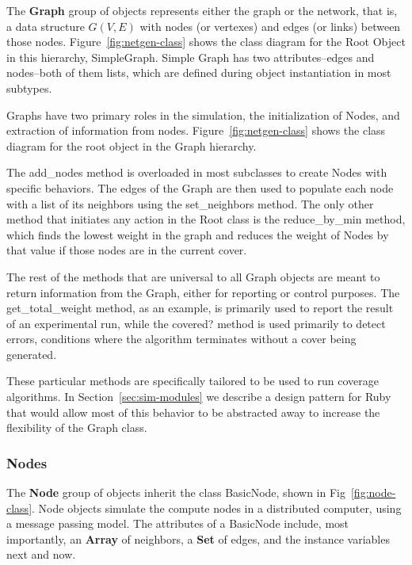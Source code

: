 \documentclass[technote, 10pt, letter]{IEEEtran}
\begin{document}
The {\bfseries Graph} group of objects represents either the graph or the network, that is, a data structure $G(V,E)$ with nodes (or vertexes) and edges (or links) between those nodes. Figure~\ref{fig:netgen-class} shows the class diagram for the Root Object in this hierarchy, {\ttfamily SimpleGraph}. Simple Graph has two attributes--{\ttfamily edges} and {\ttfamily nodes}--both of them lists, which are defined during object instantiation in most subtypes. 



Graphs have two primary roles in the simulation, the initialization of Nodes, and extraction of information from nodes. Figure~\ref{fig:netgen-class} shows the class diagram for the root object in the Graph hierarchy.

The {\ttfamily add\_nodes} method is overloaded in most subclasses to create Nodes with specific behaviors. The edges of the Graph are then used to populate each node with a list of its neighbors using the {\ttfamily set\_neighbors} method. The only other method that initiates any action in the Root class is the {\ttfamily reduce\_by\_min} method, which finds the lowest weight in the graph and reduces the weight of Nodes by that value if those nodes are in the current cover.

The rest of the methods that are universal to all Graph objects are meant to return information from the Graph, either for reporting or control purposes. The {\ttfamily get\_total\_weight} method, as an example, is primarily used to report the result of an experimental run, while the {\ttfamily covered?} method is used primarily to detect errors, conditions where the algorithm terminates without a cover being generated.

These particular methods are specifically tailored to be used to run coverage algorithms. In Section~\ref{sec:sim-modules} we describe a design pattern for Ruby that would allow most of this behavior to be abstracted away to increase the flexibility of the Graph class.

\subsubsection{Nodes}
\label{sec:sim-objects-nodes}
The {\bfseries Node} group of objects inherit the class {\ttfamily BasicNode}, shown in Fig~\ref{fig:node-class}. Node objects simulate the compute nodes in a distributed computer, using a message passing model. The attributes of a {\ttfamily BasicNode} include, most importantly, an {\bfseries Array} of neighbors, a {\bfseries Set} of edges, and the instance variables {\ttfamily next} and {\ttfamily now}.
\end{document}
